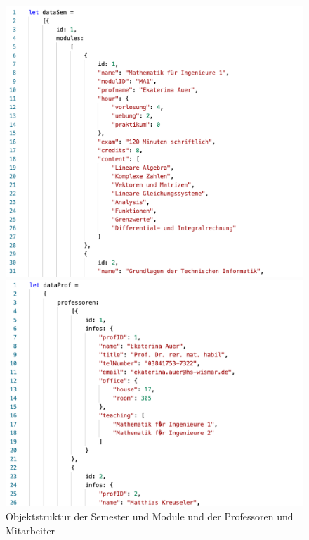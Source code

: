 \documentclass[12pt,					%
							 oneside,			%
							 a4paper,			%
							 halfparskip,		%
							 liststotoc,			%
							 bibtotoc,			%
							 fleqn,				%
							 pointlessnumbers]	%
							 {scrreprt}
\begin{document}
	\begin{figure}[h]
   		\begin{minipage}[b]{.4\linewidth} %
      		\includegraphics[width=\linewidth]{pictures/dataSem.png}
   		\end{minipage}
   		\hspace{.1\linewidth}%
   		\begin{minipage}[b]{.4\linewidth} %
      		\includegraphics[width=\linewidth]{pictures/dataProf.png}	
   		\end{minipage}
   		\caption{Objektstruktur der Semester und Module und der Professoren und Mitarbeiter}
   		\label{datastructure}
\end{figure}
	
\end{document}
